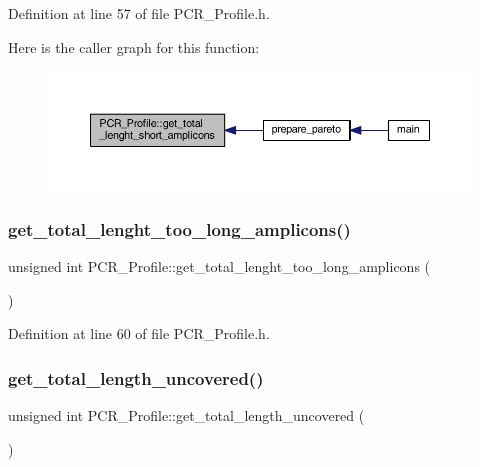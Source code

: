 Definition at line 57 of file P\+C\+R\+\_\+\+Profile.\+h.

Here is the caller graph for this function\+:
\nopagebreak
\begin{figure}[H]
\begin{center}
\leavevmode
\includegraphics[width=350pt]{class_p_c_r___profile_aa8f3e8fc43865af8734090436a0d729e_icgraph}
\end{center}
\end{figure}
\mbox{\label{class_p_c_r___profile_a0c37a463d8adedb60c5b4d8d213c182e}} 
\subsubsection{\texorpdfstring{get\+\_\+total\+\_\+lenght\+\_\+too\+\_\+long\+\_\+amplicons()}{get\_total\_lenght\_too\_long\_amplicons()}}
{\footnotesize\ttfamily unsigned int P\+C\+R\+\_\+\+Profile\+::get\+\_\+total\+\_\+lenght\+\_\+too\+\_\+long\+\_\+amplicons (\begin{DoxyParamCaption}{ }\end{DoxyParamCaption})\hspace{0.3cm}{\ttfamily [inline]}}



Definition at line 60 of file P\+C\+R\+\_\+\+Profile.\+h.

\mbox{\label{class_p_c_r___profile_abcd1baf20c93c633b00b1fbd3e662b8f}} 
\subsubsection{\texorpdfstring{get\+\_\+total\+\_\+length\+\_\+uncovered()}{get\_total\_length\_uncovered()}}
{\footnotesize\ttfamily unsigned int P\+C\+R\+\_\+\+Profile\+::get\+\_\+total\+\_\+length\+\_\+uncovered (\begin{DoxyParamCaption}{ }\end{DoxyParamCaption})\hspace{0.3cm}{\ttfamily [inline]}}



